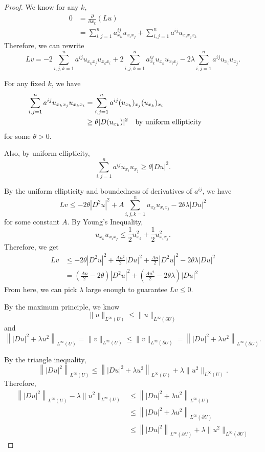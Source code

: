 \documentclass[a4paper]{article}
\begin{document}
\begin{enumerate}
\begin{proof}
      We know for any $k$,
      \begin{align*}
        0 &= \frac{\partial}{\partial x_k} (Lu) \\
        &= \sum_{i,j=1}^n a^{ij}_{x_k} u_{x_i x_j} + \sum_{i,j=1}^n a^{ij} u_{x_i x_j x_k}
      \end{align*}
      Therefore, we can rewrite
      \[ Lv = -2 \sum_{i,j,k=1}^n a^{ij} u_{x_k x_j} u_{x_k x_i} + 2 \sum_{i,j,k=1}^n a^{ij}_{x_k} u_{x_k} u_{x_i x_j} - 2 \lambda \sum_{i,j=1}^n
      a^{ij} u_{x_i} u_{x_j} .\]

      For any fixed $k$, we have
      \begin{align*}
        \sum_{i,j=1}^n a^{ij} u_{x_k x_j} u_{x_k x_i} &= \sum_{i,j=1}^n a^{ij} (u_{x_k})_{x_j} (u_{x_k})_{x_i} \\
        &\geq \theta |D(u_{x_k})|^2 \quad \parbox{5cm}{by uniform ellipticity}
      \end{align*}
      for some $\theta > 0$.

      Also, by uniform ellipticity,
      \[ \sum_{i,j=1}^n a^{ij} u_{x_i} u_{x_j} \geq \theta |Du|^2 .\]

      By the uniform ellipticity and boundedness of derivatives of $a^{ij}$, we have
      \[ Lv \leq -2 \theta |D^2 u|^2 + A \sum_{i,j,k=1}^n u_{x_k} u_{x_i x_j} - 2 \theta \lambda |Du|^2 \]
      for some constant $A$. By Young's Inequality,
      \[ u_{x_k} u_{x_i x_j} \leq \frac{1}{2} u_{x_k}^2 + \frac{1}{2} u_{x_i x_j}^2 .\]
      Therefore, we get
      \begin{align*}
        Lv &\leq -2 \theta |D^2u|^2 + \frac{A n^2}{2} |Du|^2 + \frac{A n}{2} |D^2 u|^2 - 2\theta \lambda |Du|^2 \\
        &= \left( \frac{A n}{2} - 2 \theta \right) |D^2 u|^2 + \left(\frac{A n^2}{2} - 2 \theta \lambda \right) |Du|^2
      \end{align*}
      From here, we can pick $\lambda$ large enough to guarantee $Lv \leq 0$.

      By the maximum principle, we know
      \[ \| u \|_{L^\infty(U)} \leq \| u \|_{L^\infty(\partial U)} \]
      and
      \[ \left\| |Du|^2 + \lambda u^2 \right\|_{L^\infty(U)} = \| v \|_{L^\infty(U)} \leq \| v \|_{L^\infty(\partial U)} = \left\| |Du|^2 + \lambda u^2
      \right\|_{L^\infty(\partial U)} .\]

      By the triangle inequality,
      \[ \left\| |Du|^2 \right\|_{L^\infty(U)} \leq \left\| |Du|^2 + \lambda u^2 \right\|_{L^\infty(U)} + \lambda \| u^2 \|_{L^\infty(U)} .\]
      Therefore,
      \begin{align*}
        \left\| |Du|^2 \right\|_{L^\infty(U)} - \lambda \|u^2\|_{L^\infty(U)}
        &\leq \left\| |Du|^2 + \lambda u^2 \right\|_{L^\infty(U)} \\
        &\leq \left\| |Du|^2 + \lambda u^2 \right\|_{L^\infty(\partial U)} \\
        &\leq \left\| |Du|^2 \right\|_{L^\infty(\partial U)} + \lambda \|u^2\|_{L^\infty(\partial U)}
      \end{align*}


\end{proof}
\end{enumerate}
\end{document}
